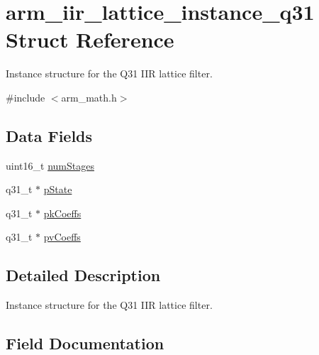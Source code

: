 \hypertarget{structarm__iir__lattice__instance__q31}{}\section{arm\+\_\+iir\+\_\+lattice\+\_\+instance\+\_\+q31 Struct Reference}
\label{structarm__iir__lattice__instance__q31}


Instance structure for the Q31 I\+IR lattice filter.  




{\ttfamily \#include $<$arm\+\_\+math.\+h$>$}

\subsection*{Data Fields}
\begin{DoxyCompactItemize}
\item 
uint16\+\_\+t \mbox{\hyperlink{structarm__iir__lattice__instance__q31_a4cceb90547b3e585d4c7aabaa8057212}{num\+Stages}}
\item 
q31\+\_\+t $\ast$ \mbox{\hyperlink{structarm__iir__lattice__instance__q31_adee4ba3ee8869865af7d8fa08ca913d6}{p\+State}}
\item 
q31\+\_\+t $\ast$ \mbox{\hyperlink{structarm__iir__lattice__instance__q31_a9d45339bf841bf86aec57be5f70d2b01}{pk\+Coeffs}}
\item 
q31\+\_\+t $\ast$ \mbox{\hyperlink{structarm__iir__lattice__instance__q31_a3d7de56fe9de3458f033a64f14407533}{pv\+Coeffs}}
\end{DoxyCompactItemize}


\subsection{Detailed Description}
Instance structure for the Q31 I\+IR lattice filter. 

\subsection{Field Documentation}
\mbox{\label{structarm__iir__lattice__instance__q31_a4cceb90547b3e585d4c7aabaa8057212}} 

